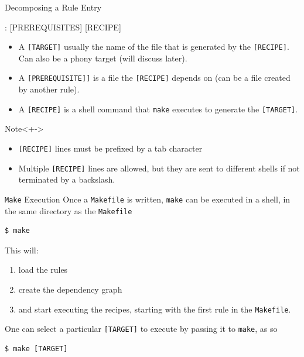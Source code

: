 \documentclass[10pt]{beamer}
\newcommand{\textco}[1]{\colorbox{bg_gray}{\texttt{#1}}}
\begin{document}
\begin{frame}[fragile]{Decomposing a Rule Entry}
\begin{makefile}
[TARGET]: [PREREQUISITES]
    [RECIPE]
\end{makefile}
  \begin{itemize}
    \item<+-> A \textco{[TARGET]} usually the name of the file that is generated by
      the \textco{[RECIPE]}. Can also be a phony target (will discuss later).\\

    \item<+-> A \textco{[PREREQUISITE]]} is a file the \textco{[RECIPE]} depends
      on (can be a file created by another rule).\\

    \item<+-> A \textco{[RECIPE]} is a shell command that \textco{make} executes
      to generate the \textco{[TARGET]}.

  \end{itemize}

  \begin{alertblock}{Note}<+->
    \begin{itemize}
    \item \textco{[RECIPE]} lines must be prefixed by a tab character
    \item Multiple \textco{[RECIPE]} lines are allowed, but they are sent to different shells if
        not terminated by a backslash.
    \end{itemize}
  \end{alertblock}
\end{frame}


\begin{frame}[fragile]{\texttt{Make} Execution}
  Once a \textco{Makefile} is written, \textco{make} can be executed in a shell,
  in the same directory as the \textco{Makefile}
  \begin{lstlisting}
$ make
\end{lstlisting}
  This will:
  \begin{enumerate}[<+->]
  \item load the rules
  \item create the dependency graph
    \item and start executing the
      recipes, starting with the first rule in the \textco{Makefile}.
    \end{enumerate}

  \pause
  One can select a particular \textco{[TARGET]} to execute by passing it to
  \textco{make}, as so
\begin{lstlisting}
$ make [TARGET]
\end{lstlisting}

\end{frame}
\end{document}
